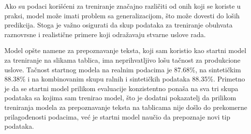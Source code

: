 \documentclass[a4paper,12pt]{article}
\begin{document}
	Ako su podaci korišćeni za treniranje značajno različiti od onih koji se koriste u praksi, model može imati problem sa generalizacijom, što može dovesti do loših predikcija. Stoga je važno osigurati da skup podataka za treniranje obuhvata raznovrsne i realistične primere koji odražavaju stvarne uslove rada.
	
	Model opšte namene za prepoznavanje teksta, koji sam koristio kao startni model za treniranje na slikama tablica, ima neprihvatljivo lošu tačnost za produkcione uslove. Tačnost startnog modela na realnim podacima je 87.68\%, na sintetičkim 88.38\% i na kombinovanim skupu ralnih i sintetičkih podataka 88.35\%. Primetno je da se startni model prilikom evaluacije konzistentno ponaša na sva tri skupa podataka sa kojima sam trenirao model, što je dodatni pokazatelj da prilikom treniranja modela za prepoznavanje teksta na tablicama nije došlo do prekomerne prilagođenosti podacima, već je startni model naučio da prepoznaje novi tip podataka.
	\newpage
	
	\printbibliography
\end{document}
